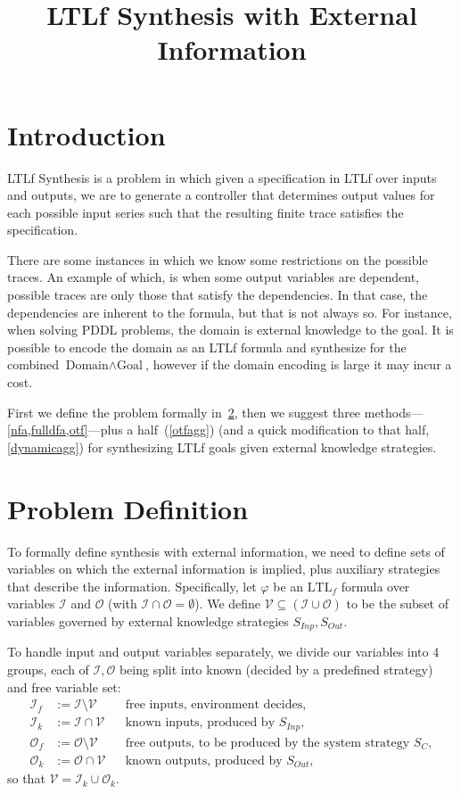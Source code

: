 \documentclass{article}
\title{LTLf Synthesis with External Information}
\newcommand{\Ifree}{\mathcal{I}_{f}}
\newcommand{\Iknown}{\mathcal{I}_{k}}
\newcommand{\Ofree}{\mathcal{O}_{f}}
\newcommand{\Oknown}{\mathcal{O}_{k}}
\newcommand{\Sin}{S_{\mathit{Inp}}}
\newcommand{\Sout}{S_{\mathit{Out}}}
\begin{document}
\maketitle

\section{Introduction}
LTLf Synthesis is a problem in which given a specification in LTLf over inputs and outputs, we are to generate a controller that determines output values for each possible input series such that the resulting finite trace satisfies the specification. 

There are some instances in which we know some restrictions on the possible traces. An example of which, is when some output variables are dependent, possible traces are only those that satisfy the dependencies. 
In that case, the dependencies are inherent to the formula, but that is not always so. For instance, when solving PDDL problems, the domain is external knowledge to the goal. 
It is possible to encode the domain as an LTLf formula and synthesize for the combined $\text{Domain} \land \text{Goal}$, however if the domain encoding is large it may incur a cost.

First we define the problem formally in~\cref{definition}, then we suggest three methods---\cref{nfa,fulldfa,otf}---plus a half~(\cref{otfagg}) (and a quick modification to that half, \cref{dynamicagg}) for synthesizing LTLf goals given external knowledge strategies.

\section{Problem Definition}\label{definition}

To formally define synthesis with external information, we need to define sets of variables on which the external information is implied, plus auxiliary strategies that describe the information. 
Specifically, let $\varphi$ be an $\text{LTL}_f$ formula over variables $\mathcal{I}$ and $\mathcal{O}$ (with $\mathcal{I} \cap \mathcal{O} = \emptyset$). We define $\mathcal{V} \subseteq (\mathcal{I} \cup \mathcal{O})$ to be the subset of variables governed by external knowledge strategies $\Sin, \Sout$.

To handle input and output variables separately, we divide our variables into 4 groups, each of $\mathcal{I}, \mathcal{O}$ being split into known (decided by a predefined strategy) and free variable set:
\begin{align*}
    \Ifree  &:= \mathcal{I} \setminus \mathcal{V} && \text{free inputs, environment decides,}\\
    \Iknown &:= \mathcal{I} \cap \mathcal{V}      && \text{known inputs, produced by } \Sin,\\
    \Ofree  &:= \mathcal{O} \setminus \mathcal{V} && \text{free outputs, to be produced by the system strategy } S_C,\\
    \Oknown &:= \mathcal{O} \cap \mathcal{V}      && \text{known outputs, produced by } \Sout,
\end{align*}
so that $\mathcal{V} = \Iknown \cup \Oknown$.
\end{document}
